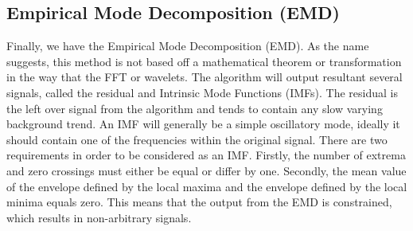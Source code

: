 \subsection{Empirical Mode Decomposition (EMD)}

	Finally, we have the Empirical Mode Decomposition (EMD).
	As the name suggests, this method is not based off a mathematical theorem or transformation in the way that the FFT or wavelets.
    The algorithm will output resultant several signals, called the residual and Intrinsic Mode Functions (IMFs).
    The residual is the left over signal from the algorithm and tends to contain any slow varying background trend.
    An IMF will generally be a simple oscillatory mode, ideally it should contain one of the frequencies within the original signal.
    There are two requirements in order to be considered as an IMF.
    Firstly, the number of extrema and zero crossings must either be equal or differ by one.
    Secondly, the mean value of the envelope defined by the local maxima and the envelope defined by the local minima equals zero.
    This means that the output from the EMD is constrained, which results in non-arbitrary signals.
    
